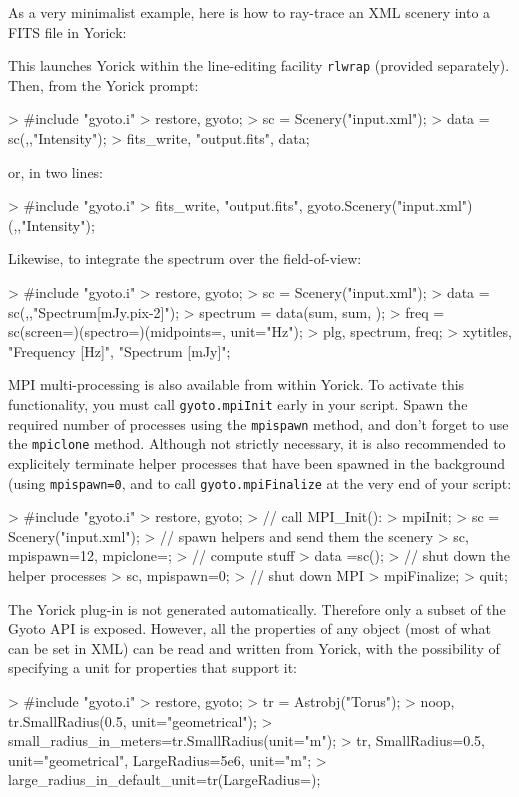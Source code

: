 \documentclass[a4paper,12pt]{article}
\begin{document}
As a very minimalist example, here is how to ray-trace an XML
scenery into a FITS file in Yorick:
This launches Yorick within the line-editing facility \texttt{rlwrap}
(provided separately). Then, from the Yorick prompt:
\begin{code}
 > #include "gyoto.i"
 > restore, gyoto;
 > sc = Scenery("input.xml");
 > data = sc(,,"Intensity");
 > fits_write, "output.fits", data;
\end{code}
or, in two lines:
\begin{code}
 > #include "gyoto.i"
 > fits_write, "output.fits", gyoto.Scenery("input.xml")(,,"Intensity");
\end{code}
Likewise, to integrate the spectrum over the field-of-view:
\begin{code}
 > #include "gyoto.i"
 > restore, gyoto;
 > sc = Scenery("input.xml");
 > data = sc(,,"Spectrum[mJy.pix-2]");
 > spectrum = data(sum, sum, );
 > freq = sc(screen=)(spectro=)(midpoints=, unit="Hz");
 > plg, spectrum, freq;
 > xytitles, "Frequency [Hz]", "Spectrum [mJy]";
\end{code}

MPI multi-processing is also available from within Yorick. To activate
this functionality, you must call \texttt{gyoto.mpiInit} early in your
script. Spawn the required number of processes using the
\texttt{mpispawn} method, and don't forget to use the
\texttt{mpiclone} method. Although not strictly necessary, it is also
recommended to explicitely terminate helper processes that have been
spawned in the background (using \texttt{mpispawn=0}, and to call
\texttt{gyoto.mpiFinalize} at the very end of your script:
\begin{code}
 > #include "gyoto.i"
 > restore, gyoto;
 > // call MPI_Init():
 > mpiInit;
 > sc = Scenery("input.xml");
 > // spawn helpers and send them the scenery
 > sc, mpispawn=12, mpiclone=;
 > // compute stuff
 > data =sc();
 > // shut down the helper processes
 > sc, mpispawn=0;
 > // shut down MPI
 > mpiFinalize;
 > quit;
\end{code}

The Yorick plug-in is not generated automatically. Therefore only a
subset of the Gyoto API is exposed. However, all the properties of any
object (most of what can be set in XML) can be read and written from
Yorick, with the possibility of specifying a unit for properties that
support it:
\begin{code}
 > #include "gyoto.i"
 > restore, gyoto;
 > tr = Astrobj("Torus");
 > noop, tr.SmallRadius(0.5, unit="geometrical");
 > small_radius_in_meters=tr.SmallRadius(unit="m");
 > tr, SmallRadius=0.5, unit="geometrical", LargeRadius=5e6, unit="m";
 > large_radius_in_default_unit=tr(LargeRadius=);
\end{code}
\end{document}
